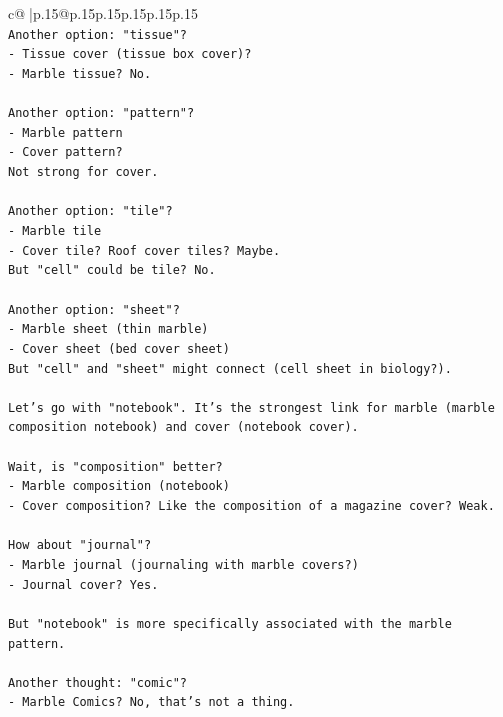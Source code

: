 \documentclass{article}
\begin{document}
{\begin{supertabular}{c@{$\;$}|p{.15\linewidth}@{}p{.15\linewidth}p{.15\linewidth}p{.15\linewidth}p{.15\linewidth}p{.15\linewidth}}
{{{\\ 
\texttt{Another option: "tissue"?} \\
\texttt{{-} Tissue cover (tissue box cover)?} \\
\texttt{{-} Marble tissue? No.} \\
\\ 
\texttt{Another option: "pattern"?} \\
\texttt{{-} Marble pattern} \\
\texttt{{-} Cover pattern?} \\
\texttt{Not strong for cover.} \\
\\ 
\texttt{Another option: "tile"?} \\
\texttt{{-} Marble tile} \\
\texttt{{-} Cover tile? Roof cover tiles? Maybe.} \\
\texttt{But "cell" could be tile? No.} \\
\\ 
\texttt{Another option: "sheet"?} \\
\texttt{{-} Marble sheet (thin marble)} \\
\texttt{{-} Cover sheet (bed cover sheet)} \\
\texttt{But "cell" and "sheet" might connect (cell sheet in biology?).} \\
\\ 
\texttt{Let's go with "notebook". It's the strongest link for marble (marble composition notebook) and cover (notebook cover).} \\
\\ 
\texttt{Wait, is "composition" better?} \\
\texttt{{-} Marble composition (notebook)} \\
\texttt{{-} Cover composition? Like the composition of a magazine cover? Weak.} \\
\\ 
\texttt{How about "journal"?} \\
\texttt{{-} Marble journal (journaling with marble covers?)} \\
\texttt{{-} Journal cover? Yes.} \\
\\ 
\texttt{But "notebook" is more specifically associated with the marble pattern.} \\
\\ 
\texttt{Another thought: "comic"?} \\
\texttt{{-} Marble Comics? No, that's not a thing.} \\
}}}
\end{supertabular}}
\end{document}
